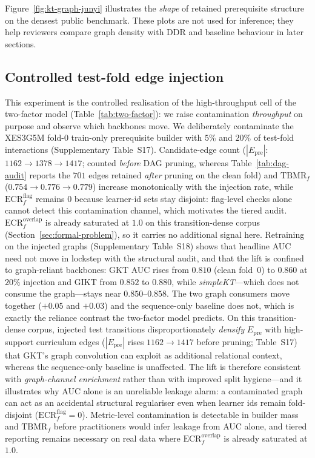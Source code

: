 \documentclass[pdflatex,sn-mathphys-num]{sn-jnl}
\newcommand{\Epre}{\ensuremath{E_{\text{pre}}}}
\newcommand{\DDR}{\textsc{DDR}}
\begin{document}
Figure~\ref{fig:kt-graph-junyi} illustrates the \emph{shape} of retained
prerequisite structure on the densest public benchmark. These plots are not
used for inference; they help reviewers compare graph density with \DDR{} and
baseline behaviour in later sections.

\subsection{Controlled test-fold edge injection}
\label{sec:exp-injection}
This experiment is the controlled realisation of the high-throughput cell of
the two-factor model (Table~\ref{tab:two-factor}): we raise contamination
\emph{throughput} on purpose and observe which backbones move. We
deliberately contaminate the XES3G5M fold-0 train-only prerequisite builder
with $5\%$ and $20\%$ of test-fold interactions (Supplementary Table~S17).
Candidate-edge count ($|\Epre|$: $1162{\to}1378{\to}1417$; counted
\emph{before} DAG pruning, whereas Table~\ref{tab:dag-audit} reports the
$701$ edges retained \emph{after} pruning on the clean fold) and
$\mathrm{TBMR}_f$ ($0.754{\to}0.776{\to}0.779$) increase monotonically with
the injection rate, while $\mathrm{ECR}^{\mathrm{flag}}_f$ remains $0$
because learner-id sets stay disjoint: flag-level checks alone cannot detect
this contamination channel, which motivates the tiered audit.
$\mathrm{ECR}^{\mathrm{overlap}}_f$ is already saturated at $1.0$ on this
transition-dense corpus (Section~\ref{sec:formal-problem}), so it carries no
additional signal here. Retraining on the injected graphs (Supplementary
Table~S18) shows that headline AUC need not move in lockstep with the
structural audit, and that the lift is confined to graph-reliant backbones:
GKT AUC rises from $0.810$ (clean fold~0) to $0.860$ at $20\%$ injection and
GIKT from $0.852$ to $0.880$, while \textit{simpleKT}---which does not consume
the graph---stays near $0.850$--$0.858$. The two graph consumers move together
($+0.05$ and $+0.03$) and the sequence-only baseline does not, which is exactly
the reliance contrast the two-factor model predicts. On this transition-dense corpus,
injected test transitions disproportionately \emph{densify} $\Epre$ with
high-support curriculum edges ($|\Epre|$ rises $1162{\to}1417$ before pruning;
Table~S17) that GKT's graph convolution can exploit as additional relational
context, whereas the sequence-only baseline is unaffected. The lift is therefore
consistent with \emph{graph-channel enrichment} rather than with improved
split hygiene---and it illustrates why AUC alone is an unreliable leakage alarm:
a contaminated graph can act as an accidental structural regulariser even when
learner ids remain fold-disjoint ($\mathrm{ECR}^{\mathrm{flag}}_f{=}0$).
Metric-level contamination is detectable in builder mass and $\mathrm{TBMR}_f$
before practitioners would infer leakage from AUC alone, and tiered reporting
remains necessary on real data where $\mathrm{ECR}^{\mathrm{overlap}}_f$ is
already saturated at $1.0$.
\end{document}
